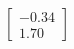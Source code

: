 \documentclass[preview]{standalone}
\begin{document}
\begin{align*}
\begin{bmatrix} -0.34 \\ 1.70 \end{bmatrix}
\end{align*}
\end{document}
